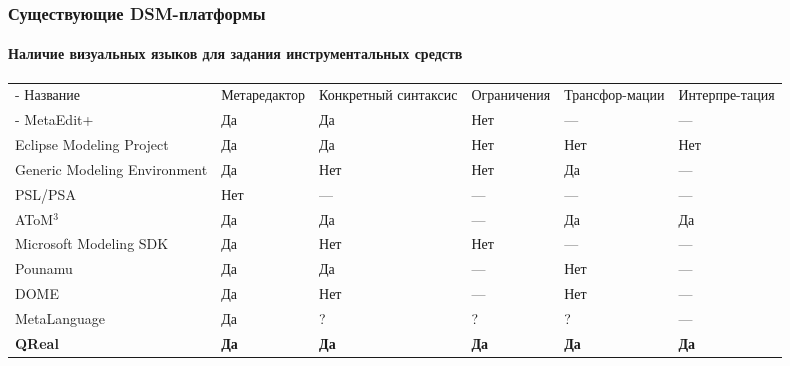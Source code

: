 \documentclass[14pt]{beamer}
\begin{document}
\begin{frame}
    \frametitle{Существующие DSM-платформы}
    \framesubtitle{Наличие визуальных языков для задания инструментальных средств}
    \begin{table}[ht]
    \begin{scriptsize}
        \tabulinesep=0.9mm
        \vspace*{-0.30cm}
    	\begin{tabu} {| X[1.2 l p] | X[1.2 c p] | X[1 c p] | X[1.1 c p] | X[1 c p] | X[1 c p] |}
    		\tabucline-
    		 Название                    & Метаредактор & Конкретный синтаксис & Ограничения & Трансфор-мации & Интерпре-тация \\
    		\tabucline-
    		\everyrow{\tabucline-}
    		MetaEdit+                    & Да           & Да                   & Нет         & ---           & ---           \\
    		Eclipse Modeling Project     & Да           & Да                   & Нет         & Нет           & Нет           \\
    		Generic Modeling Environment & Да           & Нет                  & Нет         & Да            & ---           \\
    		PSL/PSA                      & Нет          & ---                  & ---         & ---           & ---           \\
    		AToM$^3$                     & Да           & Да                   & ---         & Да            & Да            \\
    		Microsoft Modeling SDK       & Да           & Нет                  & Нет         & ---           & ---           \\
    		Pounamu                      & Да           & Да                   & ---         & Нет           & ---           \\
    		DOME                         & Да           & Нет                  & ---         & Нет           & ---           \\
    		MetaLanguage                 & Да           & ?                    & ?           & ?             & ---           \\
    		\textbf{QReal}               & \textbf{Да}  & \textbf{Да}          & \textbf{Да} & \textbf{Да}   & \textbf{Да}
    		\label{tab:existingPlatformsCondensed}
    	\end{tabu}
    \end{scriptsize}
\end{table}\end{frame}
\end{document}
